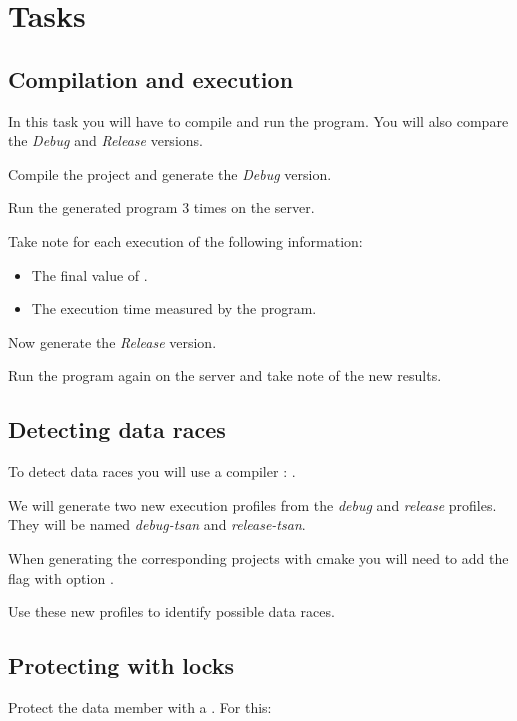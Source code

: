 \section{Tasks}

\subsection{Compilation and execution}

In this task you will have to compile and run the program.
You will also compare the \emph{Debug} and \emph{Release} versions.

Compile the project and generate the \emph{Debug} version.

Run the generated program 3 times on the  server.

Take note for each execution of the following information:
\begin{itemize}
\item The final value of .
\item The execution time measured by the program.
\end{itemize}

Now generate the \emph{Release} version.

Run the program again on the  server and take note of the new results.

\subsection{Detecting data races}

To detect data races you will use a compiler : 
.

We will generate two new execution profiles from the \emph{debug} and \emph{release} profiles.
They will be named \emph{debug-tsan} and \emph{release-tsan}.

When generating the corresponding projects with cmake you will need to add the flag
 with option
.

Use these new profiles to identify possible data races.

\subsection{Protecting with locks}

Protect the  data member with a . For this:

